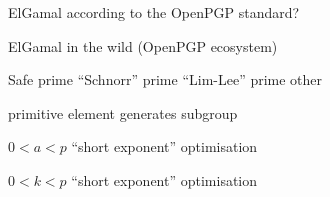 \documentclass[aspectratio=169]{beamer}
\begin{document}

\begin{frame}{ElGamal according to the OpenPGP standard?}
  \centering
\end{frame}


\begin{frame}{ElGamal in the wild (OpenPGP ecosystem)}
  \large
  \begin{description}[leftmargin=8cm]
    \setlength{\itemsep}{2em}
  \item[Large prime $p$] \hfill Safe prime \hfill ``Schnorr'' prime
    \hfill ``Lim-Lee'' prime \hfill other \hfill\strut
  \item[Generator $\alpha$] \hfill primitive element \hfill generates
    subgroup \hfill\strut
  \item[Private key] \hfill $0 < a < p$ \hfill ``short exponent'' optimisation \hfill\strut
  \item[Ephemeral key] \hfill $0 < k < p$ \hfill ``short exponent'' optimisation \hfill\strut
  \end{description}
\end{frame}
\end{document}
